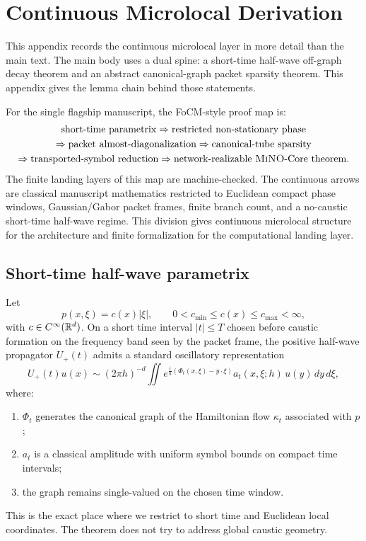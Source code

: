 \section{Continuous Microlocal Derivation}
\label{app:continuous}

This appendix records the continuous microlocal layer in more detail than the main text. The main body uses a dual spine: a short-time half-wave off-graph decay theorem and an abstract canonical-graph packet sparsity theorem. This appendix gives the lemma chain behind those statements.

For the single flagship manuscript, the FoCM-style proof map is:
\[
\begin{gathered}
\text{short-time parametrix}
\Rightarrow
\text{restricted non-stationary phase} \\
\Rightarrow
\text{packet almost-diagonalization}
\Rightarrow
\text{canonical-tube sparsity} \\
\Rightarrow
\text{transported-symbol reduction}
\Rightarrow
\text{network-realizable \textsc{MiNO}-Core theorem}.
\end{gathered}
\]
The finite landing layers of this map are machine-checked. The continuous arrows are classical manuscript mathematics restricted to Euclidean compact phase windows, Gaussian/Gabor packet frames, finite branch count, and a no-caustic short-time half-wave regime. This division gives continuous microlocal structure for the architecture and finite formalization for the computational landing layer.

\subsection{Short-time half-wave parametrix}

Let
\[
p(x,\xi)=c(x)|\xi|,
\qquad
0<c_{\min}\le c(x)\le c_{\max}<\infty,
\]
with $c\in C^\infty(\mathbb R^d)$. On a short time interval $|t|\le T$ chosen before caustic formation on the frequency band seen by the packet frame, the positive half-wave propagator $U_+(t)$ admits a standard oscillatory representation
\[
U_+(t)u(x)
\sim
(2\pi h)^{-d}
\iint e^{\frac{i}{h}(\Phi_t(x,\xi)-y\cdot\xi)}
a_t(x,\xi;h)\,u(y)\,dy\,d\xi,
\]
where:
\begin{enumerate}
\item $\Phi_t$ generates the canonical graph of the Hamiltonian flow $\kappa_t$ associated with $p$;
\item $a_t$ is a classical amplitude with uniform symbol bounds on compact time intervals;
\item the graph remains single-valued on the chosen time window.
\end{enumerate}
This is the exact place where we restrict to short time and Euclidean local coordinates. The theorem does not try to address global caustic geometry.

